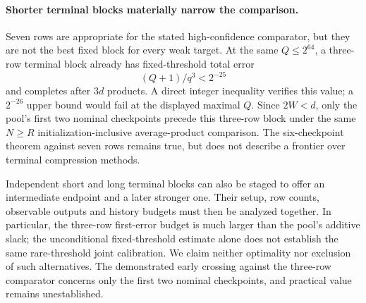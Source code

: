 \documentclass[11pt,letterpaper]{article}
\theoremstyle{definition}
\begin{document}
\paragraph{Shorter terminal blocks materially narrow the comparison.}
Seven rows are appropriate for the stated high-confidence comparator, but they are not the best fixed block for every weak target. At the same $Q\le2^{64}$, a three-row terminal block already has fixed-threshold total error
\[
 (Q+1)/q^3<2^{-25}
\]
and completes after $3d$ products. A direct integer inequality verifies this value; a $2^{-26}$ upper bound would fail at the displayed maximal $Q$. Since $2W<d$, only the pool's first two nominal checkpoints precede this three-row block under the same $N\ge R$ initialization-inclusive average-product comparison. The six-checkpoint theorem against seven rows remains true, but does not describe a frontier over terminal compression methods.

Independent short and long terminal blocks can also be staged to offer an intermediate endpoint and a later stronger one. Their setup, row counts, observable outputs and history budgets must then be analyzed together. In particular, the three-row first-error budget is much larger than the pool's additive slack; the unconditional fixed-threshold estimate alone does not establish the same rare-threshold joint calibration. We claim neither optimality nor exclusion of such alternatives. The demonstrated early crossing against the three-row comparator concerns only the first two nominal checkpoints, and practical value remains unestablished.
\end{document}
